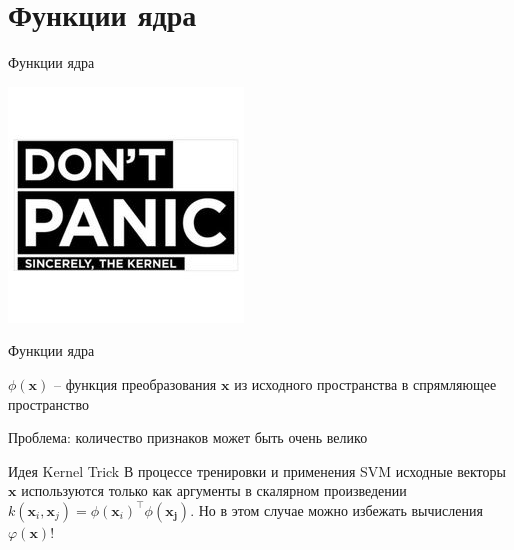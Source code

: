 \documentclass[aspectratio=169]{beamer}
\begin{document}
\section{Функции ядра}


\begin{frame}{}

\begin{center}
\Large Функции ядра

\vspace{1em}
\includegraphics[scale=0.5]{images/kernel_panic.jpg}
\end{center}

\end{frame}

\begin{frame}{Функции ядра}

$\phi(\mathbf{x})$ --  функция преобразования $\mathbf x$ из исходного пространства в спрямляющее пространство

\vspace{1em}
Проблема: количество признаков может быть очень велико

\vspace{1em}
\begin{block}{Идея Kernel Trick}
В процессе тренировки и применения SVM исходные векторы $\mathbf x$ используются только как аргументы в скалярном произведении $k(\mathbf x_i, \mathbf{x}_j) = \phi(\mathbf x_i)^\top \phi(\mathbf{x_j})$. Но в этом случае можно избежать вычисления $\varphi(\mathbf x)$!
\end{block}

\end{frame}
\end{document}
